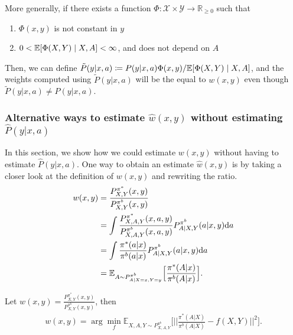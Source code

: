 More generally, if there exists a function $\Phi: \mathcal{X}\times \mathcal{Y} \rightarrow \mathbb{R}_{\geq0}$ such that 
\begin{enumerate}
    \item $\Phi(x, y)$ is not constant in $y$
    \item $0<\mathbb{E}[\Phi(X,Y) \mid X, A]< \infty$, and does not depend on $A$
\end{enumerate}
Then, we can define $\tilde{P}(y|x, a) \coloneqq P(y|x, a) \Phi(x, y)/\mathbb{E}[\Phi(X,Y) \mid X, A]$, and the weights computed using $\tilde{P}(y|x, a)$ will be the equal to $w(x, y)$ even though $\tilde{P}(y|x, a) \ne P(y|x, a)$.
\subsubsection{Alternative ways to estimate $\hat{w}(x, y)$ without estimating $\hat{P}(y| x, a)$}\label{sec:alternate_weights_est}
%
%
%
In this section, we show how we could estimate $w(x, y)$ without having to estimate $\hat{P}(y|x, a)$. One way to obtain an estimate $\hat{w}(x, y)$ is by taking a closer look at the definition of $w(x, y)$ and rewriting the ratio.
\begin{align}
    w(x,y)&=\frac{P_{X, Y}^{\pi^*}(x,y)}{P_{X, Y}^{\pi^b}(x,y)} \nonumber\\
    &=\int \frac{P_{X,A, Y}^{\pi^*}(x,a,y)}{P_{X,A, Y}^{\pi^b}(x,a,y)}P_{A|X,Y}^{\pi^b}(a|x,y)\mathrm{d}a \nonumber \\
    &=\int \frac{\pi^{\ast}(a|x)}{\pi^b (a|x)}P_{A|X,Y}^{\pi^b}(a|x,y)\mathrm{d}a \nonumber\\
    &= \mathbb{E}_{A \sim P^{\pi^b}_{A\mid X=x,Y=y}}\Big[ \frac{\pi^{\ast}(A|x)}{\pi^b (A|x)} \Big]. \label{eq:ratioidentity}
\end{align}

\begin{lemma}\label{prop:weights-est}
Let $w(x,y)=\frac{P_{X, Y}^{\pi^*}(x,y)}{P_{X, Y}^{\pi^b}(x,y)}$, then
\begin{align}
    w(x,y) = \arg\min_{f} \mathbb{E}_{X,A,Y \sim P^{\pi^b}_{X,A,Y}} \Big[\Big|\Big|\frac{\pi^{\ast}(A|X)}{\pi^b (A|X)}-f(X,Y)\Big|\Big|^2\Big]. \label{eq:weights-obj}
\end{align}
\end{lemma}
